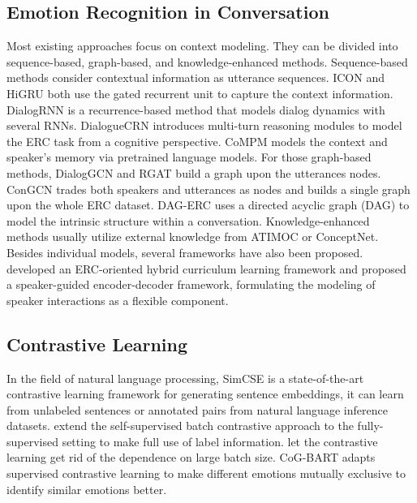 \documentclass[11pt]{article}
\begin{document}
\subsection{Emotion Recognition in Conversation}
Most existing approaches focus on context modeling. They can be divided into sequence-based, graph-based, and knowledge-enhanced methods. Sequence-based methods consider contextual information as utterance sequences. ICON\cite{hazarika2018icon} and HiGRU\cite{jiao2019higru} both use the gated recurrent unit to capture the context information. DialogRNN\cite{majumder2019dialoguernn} is a recurrence-based method that models dialog dynamics with several RNNs. DialogueCRN\cite{hu2021dialoguecrn} introduces multi-turn reasoning modules to model the ERC task from a cognitive perspective. CoMPM\cite{lee2021compm} models the context and speaker's memory via pretrained language models. For those graph-based methods, DialogGCN\cite{hu2021dialoguecrn} and RGAT\cite{ishiwatari2020relation} build a graph upon the utterances nodes. ConGCN\cite{zhang2019modeling} trades both speakers and utterances as nodes and builds a single graph upon the whole ERC dataset. DAG-ERC\cite{shen2021directed} uses a directed acyclic graph (DAG) to model the intrinsic structure within a conversation. Knowledge-enhanced methods\cite{zhong2019knowledge,zhu2021topic,ghosal2020cosmic,zhang2020knowledge} usually utilize external knowledge from ATIMOC\cite{sap2019atomic} or ConceptNet\cite{liu2004conceptnet}. Besides individual models, several frameworks have also been proposed. \citet{yang2021hybrid} developed an ERC-oriented hybrid curriculum learning framework and \citet{ijcai2022p562} proposed a speaker-guided encoder-decoder framework, formulating the modeling of speaker interactions as a flexible component.


\subsection{Contrastive Learning}

In the field of natural language processing, SimCSE\cite{gao2021simcse} is a state-of-the-art contrastive learning framework for generating sentence embeddings, it can learn from unlabeled sentences or annotated pairs from natural language inference datasets. \citet{khosla2020supervised} extend the self-supervised batch contrastive approach to the fully-supervised setting
to make full use of label information. \citet{yeh2021decoupled} let the contrastive learning get rid of the dependence on large batch size. CoG-BART\cite{li2021contrast} adapts supervised contrastive learning to make different emotions mutually exclusive to identify similar emotions better.
\end{document}
